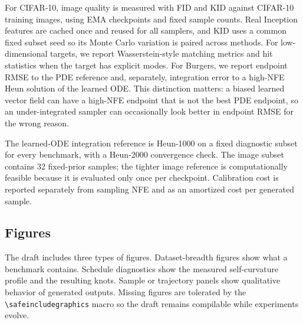 For CIFAR-10, image quality is measured with FID and KID against CIFAR-10 training images, using
EMA checkpoints and fixed sample counts. Real Inception features are cached once and reused for
all samplers, and KID uses a common fixed subset seed so its Monte Carlo variation is paired across
methods. For low-dimensional targets, we report Wasserstein-style
matching metrics and hit statistics when the target has explicit modes. For Burgers, we report
endpoint RMSE to the PDE reference and, separately, integration error to a high-NFE Heun solution
of the learned ODE. This distinction matters: a biased learned vector field can have a high-NFE
endpoint that is not the best PDE endpoint, so an under-integrated sampler can occasionally look
better in endpoint RMSE for the wrong reason.

The learned-ODE integration reference is Heun-1000 on a fixed diagnostic subset for every
benchmark, with a Heun-2000 convergence check. The image subset contains 32 fixed-prior samples;
the tighter image reference is computationally feasible because it is evaluated only once per
checkpoint. Calibration cost is reported separately from sampling NFE and as an amortized cost per
generated sample.

\subsection{Figures}
\label{sec:figures}

The draft includes three types of figures. Dataset-breadth figures show what a benchmark contains.
Schedule diagnostics show the measured self-curvature profile and the resulting knots. Sample or
trajectory panels show qualitative behavior of generated outputs. Missing figures are tolerated by
the \verb|\safeincludegraphics| macro so the draft remains compilable while experiments evolve.
